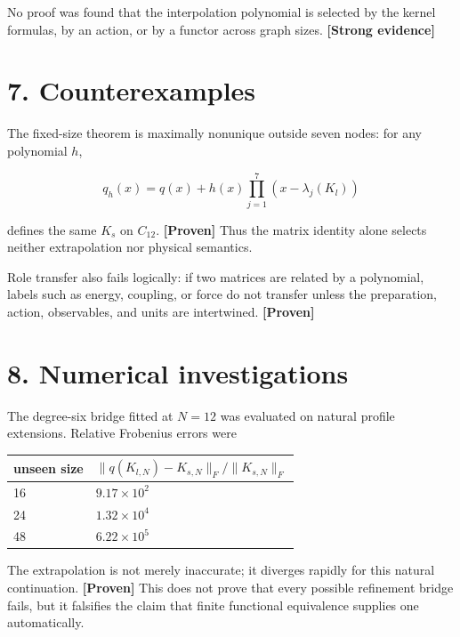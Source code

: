 \documentclass[11pt,a4paper,openany]{report}
\newcommand{\statusProven}{\textcolor{fingreen}{[Proven]}}
\newcommand{\statusStrong}{\textcolor{finblue}{[Strong evidence]}}
\begin{document}
No proof was found that the interpolation polynomial is selected by the kernel formulas, by an action, or by a functor across graph sizes. \textbf{\statusStrong{}}

\section{7. Counterexamples}

The fixed-size theorem is maximally nonunique outside seven nodes: for any polynomial \(h\),

\[
q_h(x)=q(x)+h(x)\prod_{j=1}^{7}(x-\lambda_j(K_l))
\]

defines the same \(K_s\) on \(C_{12}\). \textbf{\statusProven{}} Thus the matrix identity alone selects neither extrapolation nor physical semantics.

Role transfer also fails logically: if two matrices are related by a polynomial, labels such as energy, coupling, or force do not transfer unless the preparation, action, observables, and units are intertwined. \textbf{\statusProven{}}

\section{8. Numerical investigations}

The degree-six bridge fitted at \(N=12\) was evaluated on natural profile extensions. Relative Frobenius errors were

\begin{center}
\begingroup\small
\setlength{\tabcolsep}{3.5pt}
\renewcommand{\arraystretch}{1.16}
\begin{longtable}{@{}p{}p{}@{}}
\toprule
\textbf{unseen size} & \textbf{\(\|q(K_{l,N})-K_{s,N}\|_F/\|K_{s,N}\|_F\)} \\
\midrule
\endhead
16 & \(9.17\times10^2\) \\
24 & \(1.32\times10^4\) \\
48 & \(6.22\times10^5\) \\
\bottomrule
\end{longtable}
\endgroup
\end{center}

The extrapolation is not merely inaccurate; it diverges rapidly for this natural continuation. \textbf{\statusProven{}} This does not prove that every possible refinement bridge fails, but it falsifies the claim that finite functional equivalence supplies one automatically.
\end{document}
